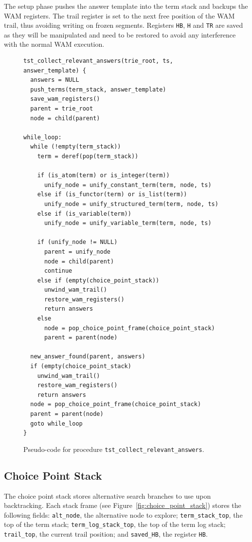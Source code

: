 The setup phase pushes the answer template into the term stack and backups the WAM registers.
The trail register is set to the next free position
of the WAM trail, thus avoiding writing on frozen segments. Registers \texttt{HB}, \texttt{H} and \texttt{TR} are
saved as they will be manipulated and need to be restored to avoid any interference with
the normal WAM execution.

\begin{figure}[ht]
\begin{Verbatim}
tst_collect_relevant_answers(trie_root, ts, answer_template) {
  answers = NULL
  push_terms(term_stack, answer_template)
  save_wam_registers()
  parent = trie_root
  node = child(parent)
  
while_loop:
  while (!empty(term_stack))
    term = deref(pop(term_stack))
    
    if (is_atom(term) or is_integer(term))
      unify_node = unify_constant_term(term, node, ts)
    else if (is_functor(term) or is_list(term))
      unify_node = unify_structured_term(term, node, ts)
    else if (is_variable(term))
      unify_node = unify_variable_term(term, node, ts)
      
    if (unify_node != NULL)
      parent = unify_node
      node = child(parent)
      continue
    else if (empty(choice_point_stack))
      unwind_wam_trail()
      restore_wam_registers()
      return answers
    else
      node = pop_choice_point_frame(choice_point_stack)
      parent = parent(node)
  
  new_answer_found(parent, answers)
  if (empty(choice_point_stack)
    unwind_wam_trail()
    restore_wam_registers()
    return answers
  node = pop_choice_point_frame(choice_point_stack)
  parent = parent(node)
  goto while_loop
}
\end{Verbatim}
\caption{Pseudo-code for procedure \texttt{tst\_collect\_relevant\_answers}.}
\label{fig:tst_collect_relevant_answers}
\end{figure}

\subsection{Choice Point Stack}\label{sec:cpstack_section}

The choice point stack stores alternative search branches to use upon backtracking.
Each stack frame (see Figure~\ref{fig:choice_point_stack}) stores the following fields:
\texttt{alt\_node}, the alternative node to explore;
\texttt{term\_stack\_top}, the top of the term stack;
\texttt{term\_log\_stack\_top}, the top of the term log stack;
\texttt{trail\_top}, the current trail position;
and \texttt{saved\_HB}, the register \texttt{HB}.

